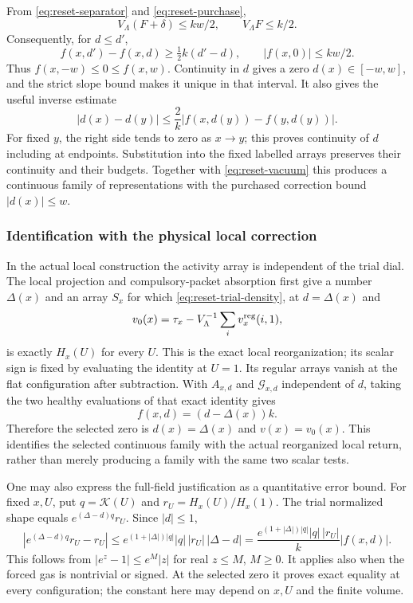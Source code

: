 From \eqref{eq:reset-separator} and \eqref{eq:reset-purchase},
\[
 V_\Lambda(F+\delta)\le kw/2,\qquad V_\Lambda F\le k/2.
\]
Consequently, for $d\le d'$,
\[
 f(x,d')-f(x,d)\ge\tfrac12k(d'-d),\qquad
                         |f(x,0)|\le kw/2.
\]
Thus $f(x,-w)\le0\le f(x,w)$. Continuity in $d$ gives a zero
$d(x)\in[-w,w]$, and the strict slope bound makes it unique in that
interval. It also gives the useful inverse estimate
\begin{equation}\label{eq:reset-inverse}
 |d(x)-d(y)|\le \frac2k|f(x,d(y))-f(y,d(y))|.
\end{equation}
For fixed $y$, the right side tends to zero as $x\to y$; this proves
continuity of $d$ including at endpoints. Substitution into the fixed
labelled arrays preserves their continuity and their budgets. Together
with \eqref{eq:reset-vacuum} this produces a continuous family of
representations with the purchased correction bound $|d(x)|\le w$.

\subsubsection{Identification with the physical local correction}
In the actual local construction the activity array is independent of
the trial dial. The local projection and compulsory-packet absorption
first give a number $\Delta(x)$ and an array $S_x$ for which
\eqref{eq:reset-trial-density}, at $d=\Delta(x)$ and
\[
 v_0(x)=\tau_x-V_\Lambda^{-1}\sum_i v_x^{\rm reg}(i,1),
\]
is exactly $H_x(U)$ for every $U$. This is the exact local
reorganization; its scalar sign is fixed by evaluating the identity at
$U=1$. Its regular arrays vanish at the flat configuration after
subtraction. With $A_{x,d}$ and $\mathcal G_{x,d}$ independent of $d$,
taking the two healthy evaluations of that exact identity gives
\begin{equation}\label{eq:reset-physical-residual}
                         f(x,d)=(d-\Delta(x))k.
\end{equation}
Therefore the selected zero is $d(x)=\Delta(x)$ and $v(x)=v_0(x)$.
This identifies the selected continuous family with the actual
reorganized local return, rather than merely producing a family with
the same two scalar tests.

One may also express the full-field justification as a quantitative
error bound. For fixed $x,U$, put $q=\mathcal K(U)$ and
$r_U=H_x(U)/H_x(1)$. The trial normalized shape equals
$e^{(\Delta-d)q}r_U$. Since $|d|\le1$,
\[
 |e^{(\Delta-d)q}r_U-r_U|
 \le e^{(1+|\Delta|)|q|}|q|\,|r_U|\,|\Delta-d|
 =\frac{e^{(1+|\Delta|)|q|}|q|\,|r_U|}{k}|f(x,d)|.
\]
This follows from $|e^z-1|\le e^M|z|$ for real $z\le M$, $M\ge0$.
It applies also when the forced gas is nontrivial or signed. At the
selected zero it proves exact equality at every configuration; the
constant here may depend on $x,U$ and the finite volume.

